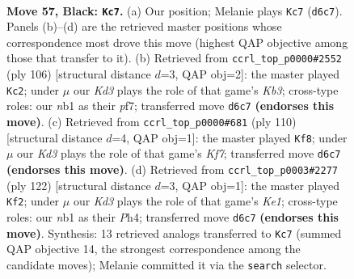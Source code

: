 \documentclass[11pt]{article}
\begin{document}
\clearpage

\begin{figure}[p]\centering
\begin{subfigure}{0.46\textwidth}\centering
\resizebox{\linewidth}{!}{%
\newchessgame
\chessboard[
  setfen={8/8/p2k1B2/8/2p3b1/8/5K2/1N6 b - - 13 57},
  showmover=false,
  pgfstyle=straightmove, color=movearrow, markmove={d6-c7}
]}
\caption{}
\end{subfigure}\hfill
\begin{subfigure}{0.46\textwidth}\centering
\resizebox{\linewidth}{!}{%
\newchessgame
\chessboard[
  setfen={8/5p2/5B2/3k4/8/1K6/3b1PP1/8 w - - 5 54},
  showmover=false,
  pgfstyle=straightmove, color=movearrow, markmove={b3-c2}
]}
\caption{}
\end{subfigure}
\\[4pt]
\begin{subfigure}{0.46\textwidth}\centering
\resizebox{\linewidth}{!}{%
\newchessgame
\chessboard[
  setfen={3b4/3P1K2/p7/8/8/k7/8/3B4 w - - 0 56},
  showmover=false,
  pgfstyle=straightmove, color=movearrow, markmove={f7-f8}
]}
\caption{}
\end{subfigure}\hfill
\begin{subfigure}{0.46\textwidth}\centering
\resizebox{\linewidth}{!}{%
\newchessgame
\chessboard[
  setfen={8/8/5k2/1b6/5pBP/P7/8/4K3 w - - 3 62},
  showmover=false,
  pgfstyle=straightmove, color=movearrow, markmove={e1-f2}
]}
\caption{}
\end{subfigure}
\caption{\textbf{Move 57, Black: \texttt{Kc7}.} (a) Our position; Melanie plays \texttt{Kc7} (\texttt{d6c7}). Panels (b)--(d) are the retrieved master positions whose correspondence most drove this move (highest QAP objective among those that transfer to it). (b) Retrieved from \texttt{ccrl\_top\_p0000\#2552} (ply 106) [structural distance $d$=3, QAP obj=2]: the master played \texttt{Kc2}; under $\mu$ our \emph{Kd3} plays the role of that game's \emph{Kb3}; cross-type roles: our \emph{n}b1 as their \emph{p}f7; transferred move \texttt{d6c7} \textbf{(endorses this move)}. (c) Retrieved from \texttt{ccrl\_top\_p0000\#681} (ply 110) [structural distance $d$=4, QAP obj=1]: the master played \texttt{Kf8}; under $\mu$ our \emph{Kd3} plays the role of that game's \emph{Kf7}; transferred move \texttt{d6c7} \textbf{(endorses this move)}. (d) Retrieved from \texttt{ccrl\_top\_p0003\#2277} (ply 122) [structural distance $d$=3, QAP obj=1]: the master played \texttt{Kf2}; under $\mu$ our \emph{Kd3} plays the role of that game's \emph{Ke1}; cross-type roles: our \emph{n}b1 as their \emph{P}h4; transferred move \texttt{d6c7} \textbf{(endorses this move)}. Synthesis: 13 retrieved analogs transferred to \texttt{Kc7} (summed QAP objective 14, the strongest correspondence among the candidate moves); Melanie committed it via the \texttt{search} selector.}
\label{fig:thought-m113}
\end{figure}
\end{document}
